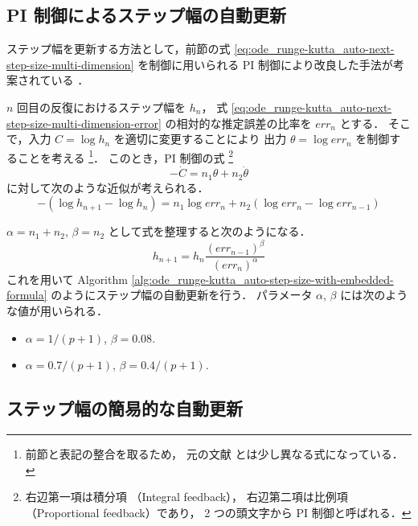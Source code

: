 \subsection{PI 制御によるステップ幅の自動更新}
\label{chap:ode_runge-kutta_auto-next-step-size-pi-controller}

ステップ幅を更新する方法として，前節の式
\eqref{eq:ode_runge-kutta_auto-next-step-size-multi-dimension}
を制御に用いられる PI 制御により改良した手法が考案されている
\cite[Section IV.2]{Hairer1991}．

$n$ 回目の反復におけるステップ幅を $h_n$，
式 \eqref{eq:ode_runge-kutta_auto-next-step-size-multi-dimension-error}
の相対的な推定誤差の比率を $err_n$ とする．
そこで，入力 $C = \log{h_n}$ を適切に変更することにより
出力 $\theta = \log{err_n}$ を制御することを考える
\footnote{前節と表記の整合を取るため，%
    元の文献 \cite[Section IV.2]{Hairer1991} とは少し異なる式になっている．}．
このとき，PI 制御の式
\footnote{右辺第一項は積分項 （Integral feedback），%
    右辺第二項は比例項（Proportional feedback）であり，%
    2 つの頭文字から PI 制御と呼ばれる．}
\begin{equation}
    -\dot{C} = n_1 \theta + n_2 \dot{\theta}
\end{equation}
に対して次のような近似が考えられる．
\begin{equation}
    -(\log{h_{n+1}} - \log{h_n}) = n_1 \log{err_n} + n_2 (\log{err_{n}} - \log{err_{n-1}})
\end{equation}

$\alpha = n_1 + n_2$, $\beta = n_2$ として式を整理すると次のようになる．
\begin{equation}
    h_{n+1} = h_n \frac{(err_{n-1})^\beta}{(err_n)^\alpha}
    \label{eq:ode_runge-kutta_auto-next-step-size-pi}
\end{equation}
これを用いて
Algorithm \ref{alg:ode_runge-kutta_auto-step-size-with-embedded-formula}
のようにステップ幅の自動更新を行う．
パラメータ $\alpha$, $\beta$ には次のような値が用いられる．
\begin{itemize}
    \item $\alpha = 1 / (p + 1)$, $\beta = 0.08$. \cite[Section IV.2]{Hairer1991}
    \item $\alpha = 0.7 / (p + 1)$, $\beta = 0.4 / (p + 1)$. \cite{Gustafsson1991}
\end{itemize}

\subsection{ステップ幅の簡易的な自動更新}

